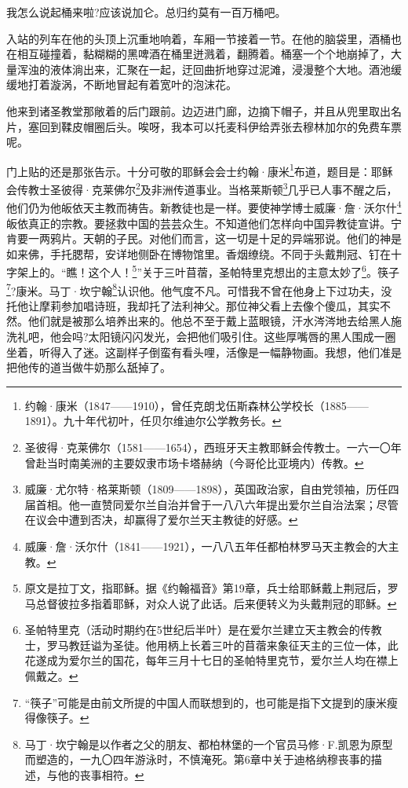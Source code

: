 \par 我怎么说起桶来啦?应该说加仑。总归约莫有一百万桶吧。
\par 入站的列车在他的头顶上沉重地响着，车厢一节接着一节。在他的脑袋里，酒桶也在相互碰撞着，黏糊糊的黑啤酒在桶里迸溅着，翻腾着。桶塞一个个地崩掉了，大量浑浊的液体淌出来，汇聚在一起，迂回曲折地穿过泥滩，浸漫整个大地。酒池缓缓地打着漩涡，不断地冒起有着宽叶的泡沫花。
\par 他来到诸圣教堂那敞着的后门跟前。边迈进门廊，边摘下帽子，并且从兜里取出名片，塞回到鞣皮帽圈后头。唉呀，我本可以托麦科伊给弄张去穆林加尔的免费车票呢。
\par 门上贴的还是那张告示。十分可敬的耶稣会会士约翰·康米\footnote{约翰·康米（1847——1910），曾任克朗戈伍斯森林公学校长（1885——1891）。九十年代初叶，任贝尔维迪尔公学教务长。}布道，题目是：耶稣会传教士圣彼得·克莱佛尔\footnote{圣彼得·克莱佛尔（1581——1654），西班牙天主教耶稣会传教士。一六一〇年曾赴当时南美洲的主要奴隶市场卡塔赫纳（今哥伦比亚境内）传教。}及非洲传道事业。当格莱斯顿\footnote{威廉·尤尔特·格莱斯顿（1809——1898），英国政治家，自由党领袖，历任四届首相。他一直赞同爱尔兰自治并曾于一八八六年提出爱尔兰自治法案；尽管在议会中遭到否决，却赢得了爱尔兰天主教徒的好感。}几乎已人事不醒之后，他们仍为他皈依天主教而祷告。新教徒也是一样。要使神学博士威廉·詹·沃尔什\footnote{威廉·詹·沃尔什（1841——1921），一八八五年任都柏林罗马天主教会的大主教。}皈依真正的宗教。要拯救中国的芸芸众生。不知道他们怎样向中国异教徒宣讲。宁肯要一两鸦片。天朝的子民。对他们而言，这一切是十足的异端邪说。他们的神是如来佛，手托腮帮，安详地侧卧在博物馆里。香烟缭绕。不同于头戴荆冠、钉在十字架上的。“瞧！这个人！\footnote{原文是拉丁文，指耶稣。据《约翰福音》第19章，兵士给耶稣戴上荆冠后，罗马总督彼拉多指着耶稣，对众人说了此话。后来便转义为头戴荆冠的耶稣。}”关于三叶苜蓿，圣帕特里克想出的主意太妙了\footnote{圣帕特里克（活动时期约在5世纪后半叶）是在爱尔兰建立天主教会的传教士，罗马教廷谥为圣徒。他用柄上长着三叶的苜蓿来象征天主的三位一体，此花遂成为爱尔兰的国花，每年三月十七日的圣帕特里克节，爱尔兰人均在襟上佩戴之。}。筷子\footnote{“筷子”可能是由前文所提的中国人而联想到的，也可能是指下文提到的康米瘦得像筷子。}?康米。马丁·坎宁翰\footnote{马丁·坎宁翰是以作者之父的朋友、都柏林堡的一个官员马修·F.凯恩为原型而塑造的，一九〇四年游泳时，不慎淹死。第6章中关于迪格纳穆丧事的描述，与他的丧事相符。}认识他。他气度不凡。可惜我不曾在他身上下过功夫，没托他让摩莉参加唱诗班，我却托了法利神父。那位神父看上去像个傻瓜，其实不然。他们就是被那么培养出来的。他总不至于戴上蓝眼镜，汗水涔涔地去给黑人施洗礼吧，他会吗?太阳镜闪闪发光，会把他们吸引住。这些厚嘴唇的黑人围成一圈坐着，听得入了迷。这副样子倒蛮有看头哩，活像是一幅静物画。我想，他们准是把他传的道当做牛奶那么舐掉了。
